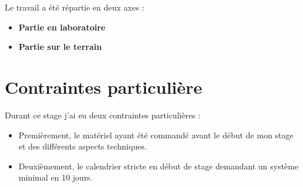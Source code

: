     \begin{flushleft}
        Le travail a été répartie en deux axes :
        \begin{itemize}
            \item  \textbf{Partie en laboratoire}
            \item  \textbf{Partie sur le terrain}
        \end{itemize}
        
        \vspace{0.5cm}      
    \end{flushleft}

    \section{Contraintes particulière}
    Durant ce stage j'ai eu deux contraintes particulières :
    \begin{itemize}
        \item  Premièrement, le matériel ayant été commandé avant le début de mon stage et des différents aspects techniques.
        \item  Deuxièmement, le calendrier stricte en début de stage demandant un système minimal en 10 jours.
    \end{itemize}